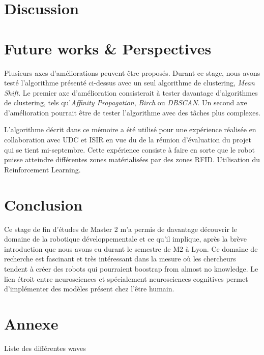 \documentclass{llncs}
\begin{document}
\section{Discussion}

\section{Future works \& Perspectives}

Plusieurs axes d'améliorations peuvent être proposés. Durant ce stage, nous avons testé l'algorithme présenté ci-dessus avec un seul algorithme de clustering, \textit{Mean Shift}. Le premier axe d'amélioration consisterait à tester davantage d'algorithmes de clustering, tels qu'\textit{Affinity Propagation}, \textit{Birch} ou \textit{DBSCAN}. Un second axe d'amélioration pourrait être de tester l'algorithme avec des tâches plus complexes.

L'algorithme décrit dans ce mémoire a été utilisé pour une expérience réalisée en collaboration avec UDC et ISIR en vue du de la réunion d'évaluation du projet qui se tient mi-septembre. Cette expérience consiste à faire en sorte que le robot puisse atteindre différentes zones matérialisées par des zones RFID. Utilisation du Reinforcement Learning.

\section{Conclusion}

Ce stage de fin d'études de Master 2 m'a permis de davantage découvrir le domaine de la robotique développementale et ce qu'il implique, après la brève introduction que nous avons eu durant le semestre de M2 à Lyon. Ce domaine de recherche est fascinant et très intéressant dans la mesure où les chercheurs tendent à créer des robots qui pourraient boostrap from almost no knowledge. Le lien étroit entre neurosciences et spécialement neurosciences cognitives permet d'implémenter des modèles présent chez l'être humain.

\section*{Annexe}

Liste des différentes waves
\end{document}
